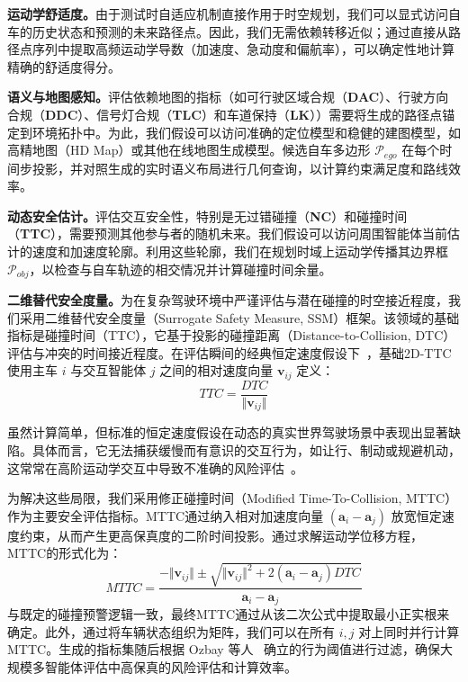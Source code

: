 \documentclass{article}
\begin{document}
\textbf{运动学舒适度。}由于测试时自适应机制直接作用于时空规划，我们可以显式访问自车的历史状态和预测的未来路径点。因此，我们无需依赖转移近似；通过直接从路径点序列中提取高频运动学导数（加速度、急动度和偏航率），可以确定性地计算精确的舒适度得分。

\textbf{语义与地图感知。}评估依赖地图的指标（如可行驶区域合规（\textbf{DAC}）、行驶方向合规（\textbf{DDC}）、信号灯合规（\textbf{TLC}）和车道保持（\textbf{LK}））需要将生成的路径点锚定到环境拓扑中。为此，我们假设可以访问准确的定位模型和稳健的建图模型，如高精地图（HD Map）或其他在线地图生成模型。候选自车多边形 $\mathcal{P}_{ego}$ 在每个时间步投影，并对照生成的实时语义布局进行几何查询，以计算约束满足度和路线效率。

\textbf{动态安全估计。}评估交互安全性，特别是无过错碰撞（\textbf{NC}）和碰撞时间（\textbf{TTC}），需要预测其他参与者的随机未来。我们假设可以访问周围智能体当前估计的速度和加速度轮廓。利用这些轮廓，我们在规划时域上运动学传播其边界框 $\mathcal{P}_{obj}$，以检查与自车轨迹的相交情况并计算碰撞时间余量。

\textbf{二维替代安全度量。}为在复杂驾驶环境中严谨评估与潜在碰撞的时空接近程度，我们采用二维替代安全度量（Surrogate Safety Measure, SSM）框架。该领域的基础指标是碰撞时间（TTC），它基于投影的碰撞距离（Distance-to-Collision, DTC）评估与冲突的时间接近程度。在评估瞬间的经典恒定速度假设下~\cite{tarko2018surrogate}，基础2D-TTC使用主车 $i$ 与交互智能体 $j$ 之间的相对速度向量 $\boldsymbol{v}_{ij}$ 定义：
\begin{equation}
    TTC = \frac{DTC}{\Vert\boldsymbol{v}_{ij}\Vert}
\end{equation}

虽然计算简单，但标准的恒定速度假设在动态的真实世界驾驶场景中表现出显著缺陷。具体而言，它无法捕获缓慢而有意识的交互行为，如让行、制动或规避机动，这常常在高阶运动学交互中导致不准确的风险评估~\cite{guo2023modeling, laureshyn2010evaluation}。

为解决这些局限，我们采用修正碰撞时间（Modified Time-To-Collision, MTTC）作为主要安全评估指标。MTTC通过纳入相对加速度向量 $(\boldsymbol{a}_i - \boldsymbol{a}_j)$ 放宽恒定速度约束，从而产生更高保真度的二阶时间投影。通过求解运动学位移方程，MTTC的形式化为：
\begin{equation}
    MTTC = \frac{-\Vert\boldsymbol{v}_{ij}\Vert \pm \sqrt{\Vert\boldsymbol{v}_{ij}\Vert^2 + 2(\boldsymbol{a}_i - \boldsymbol{a}_j)DTC}}{\boldsymbol{a}_i - \boldsymbol{a}_j}
\end{equation}
与既定的碰撞预警逻辑一致，最终MTTC通过从该二次公式中提取最小正实根来确定。此外，通过将车辆状态组织为矩阵，我们可以在所有 $i,j$ 对上同时并行计算MTTC。生成的指标集随后根据 Ozbay 等人~\cite{ozbay2008derivation} 确立的行为阈值进行过滤，确保大规模多智能体评估中高保真的风险评估和计算效率。
\end{document}
